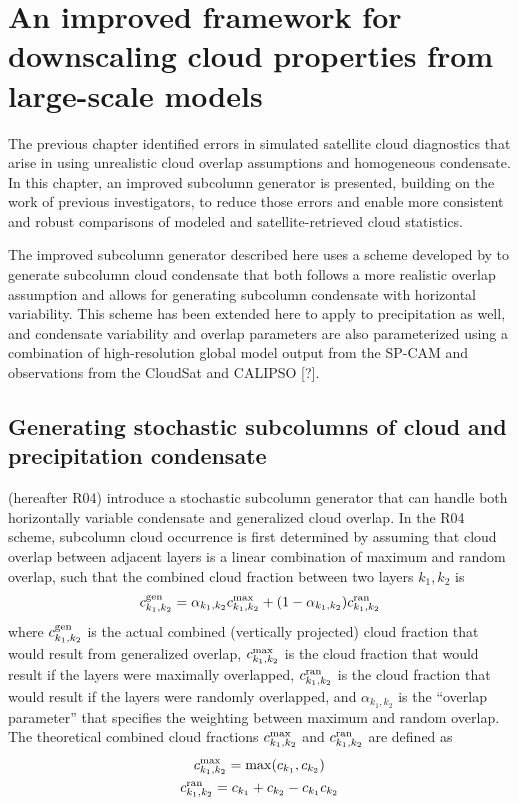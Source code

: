 \chapter{An improved framework for downscaling cloud properties from large-scale models}\label{sgi_chapter}
The previous chapter identified errors in simulated satellite cloud diagnostics that arise in using unrealistic cloud overlap assumptions and homogeneous condensate. In this chapter, an improved subcolumn generator is presented, building on the work of previous investigators, to reduce those errors and enable more consistent and robust comparisons of modeled and satellite-retrieved cloud statistics. 

The improved subcolumn generator described here uses a scheme developed by \cite{raisanen_et_al_2004} to generate subcolumn cloud condensate that both follows a more realistic overlap assumption and allows for generating subcolumn condensate with horizontal variability. This scheme has been extended here to apply to precipitation as well, and condensate variability and overlap parameters are also parameterized using a combination of high-resolution global model output from the SP-CAM and observations from the CloudSat and CALIPSO [?].

\section{Generating stochastic subcolumns of cloud and precipitation condensate}
\cite{raisanen_et_al_2004} (hereafter R04) introduce a stochastic subcolumn generator that can handle both horizontally variable condensate and generalized cloud overlap. In the R04 scheme, subcolumn cloud occurrence is first determined by assuming that cloud overlap between adjacent layers is a linear combination of maximum and random overlap, such that the combined cloud fraction between two layers $k_1, k_2$ is
\begin{gather}
c_{k_1, k_2}^{\rm gen} = \alpha_{k_1, k_2} c_{k_1, k_2}^{\rm max} + (1 - \alpha_{k_1, k_2})
c_{k_1, k_2}^{\rm ran}
    \label{generalized_overlap_equation}
\end{gather}
where $c_{k_1, k_2}^{\rm gen}$ is the actual combined (vertically projected) cloud fraction that would result from generalized overlap, $c_{k_1, k_2}^{\rm max}$ is the cloud fraction that would result if the layers were maximally overlapped, $c_{k_1, k_2}^{\rm ran}$ is the cloud fraction that would result if the layers were randomly overlapped, and $\alpha_{k_1, k_2}$ is the ``overlap parameter'' that specifies the weighting between maximum and random overlap. The theoretical combined cloud fractions $c^{\rm max}_{k_1, k_2}$ and $c^{\rm ran}_{k_1, k_2}$ are defined as
\begin{gather}
    c^{\rm max}_{k_1, k_2} = \max(c_{k_1}, c_{k_2}) \\
    c^{\rm ran}_{k_1, k_2} = c_{k_1} + c_{k_2} - c_{k_1} c_{k_2}
\end{gather}


